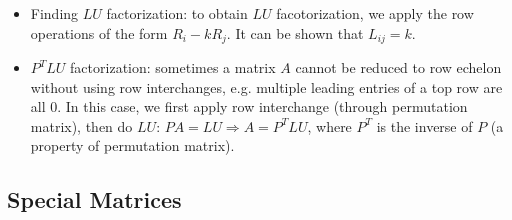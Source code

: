 \documentclass{report}
\begin{document}
\begin{itemize}
\item Finding $LU$ factorization: to obtain $LU$ facotorization, we apply the row operations of the form $R_i - k R_j$. It can be shown that $L_{ij} = k$. 

\item $P^T LU$ factorization: sometimes a matrix $A$ cannot be reduced to row echelon without using row interchanges, e.g. multiple leading entries of a top row are all 0. In this case, we first apply row interchange (through permutation matrix), then do $LU$: $PA = LU \Rightarrow A = P^T LU$, where $P^T$ is the inverse of $P$ (a property of permutation matrix). 
\end{itemize}

\subsection{Special Matrices}
\end{document}
